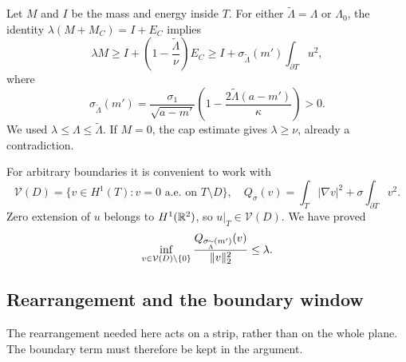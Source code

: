 Let $M$ and $I$ be the mass and energy inside $T$. For either $\widetilde\Lambda=\Lambda$ or $\Lambda_0$, the identity $\lambda(M+M_C)=I+E_C$ implies
\[
 \lambda M\ge I+\left(1-\frac{\widetilde\Lambda}{\nu}\right)E_C
 \ge I+\sigma_{\widetilde\Lambda}(m')\int_{\partial T}u^2,
\]
where
\begin{equation}\label{eq:sigma}
 \sigma_{\widetilde\Lambda}(m')=
 \frac{\sigma_1}{\sqrt{a-m'}}
 \left(1-\frac{2\widetilde\Lambda(a-m')}{\kappa}\right)>0.
\end{equation}
We used $\lambda\le\Lambda\le\widetilde\Lambda$. If $M=0$, the cap estimate gives $\lambda\ge\nu$, already a contradiction.

For arbitrary boundaries it is convenient to work with
\[
 \mathcal V(D)=\{v\in H^1(T):v=0\text{ a.e. on }T\setminus D\},\quad
 Q_\sigma(v)=\int_T|\nabla v|^2+\sigma\int_{\partial T}v^2.
\]
Zero extension of $u$ belongs to $H^1(\mathbb R^2)$, so $u|_T\in\mathcal V(D)$. We have proved
\begin{equation}\label{eq:robin}
 \inf_{v\in\mathcal V(D)\setminus\{0\}}
 \frac{Q_{\sigma_{\widetilde\Lambda}(m')}(v)}{\lVert v\rVert_2^2}\le\lambda.
\end{equation}

\subsection{Rearrangement and the boundary window}
The rearrangement needed here acts on a strip, rather than on the whole plane. The boundary term must therefore be kept in the argument.

